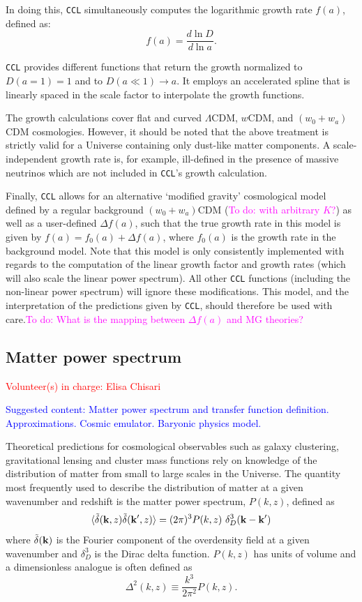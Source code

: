 \documentclass[\docopts]{\docclass}
\newcommand{\todo}[1]{\textcolor{magenta}{To do: #1}}
\newcommand{\vol}[1]{\textcolor{red}{Volunteer(s) in charge: #1}}
\newcommand{\cont}[1]{\textcolor{blue}{Suggested content: #1}}
\newcommand{\ccl}{{\tt CCL}\xspace}
\begin{document}
In doing this, \ccl simultaneously computes the logarithmic growth rate $f(a)$, defined as:
\begin{equation}
  f(a)=\frac{d\ln D}{d\ln a}.
\end{equation}

\ccl provides different functions that return the growth normalized to $D(a=1)=1$ and to $D(a\ll1)\rightarrow a$. It employs an accelerated spline that is linearly spaced in the scale factor to interpolate the growth functions. 

The growth calculations cover flat and curved $\Lambda$CDM, $w$CDM, and $(w_0 + w_a)$CDM cosmologies. However, it should be noted that the above treatment is strictly valid for a Universe containing only dust-like matter components. A scale-independent growth rate is, for example, ill-defined in the presence of massive neutrinos which are not included in \ccl 's growth calculation. 

Finally, \ccl allows for an alternative `modified gravity' cosmological model defined by a regular background $(w_0+w_a)$CDM (\todo{with arbitrary $K$?}) as well as a user-defined $\Delta f(a)$, such that the true growth rate in this model is given by $f(a)=f_0(a)+\Delta f(a)$, where $f_0(a)$ is the growth rate in the background model. Note that this model is only consistently implemented with regards to the computation of the linear growth factor and growth rates (which will also scale the linear power spectrum). All other \ccl functions (including the non-linear power spectrum) will ignore these modifications. This model, and the interpretation of the predictions given by \ccl, should therefore be used with care.\todo{What is the mapping between $\Delta f(a)$ and MG theories?}


\subsection{Matter power spectrum}
\vol{Elisa Chisari}

\cont{Matter power spectrum and transfer function definition. Approximations. Cosmic emulator. Baryonic physics model.}

Theoretical predictions for cosmological observables such as galaxy clustering, gravitational lensing and cluster mass functions rely on knowledge of the distribution of matter from small to large scales in the Universe. The quantity most frequently used to describe the distribution of matter at a given wavenumber and redshift is the matter power spectrum, $P(k,z)$, defined as
\begin{equation}
  \langle \tilde\delta({\bf k},z)\tilde\delta({\bf k}^\prime,z)\rangle = (2\pi)^3P(k,z)\
\delta_D^3({\bf k}-{\bf k}')
\end{equation}
where $\tilde\delta({\bf k})$ is the Fourier component of the overdensity field at a given wavenumber and $\delta_D^3$ is the Dirac delta function. $P(k,z)$ has units of volume and a dimensionless analogue is often defined as
\begin{equation}
  \Delta^2(k,z) \equiv \frac{k^3}{2\pi^2}P(k,z).
\end{equation}
\end{document}
